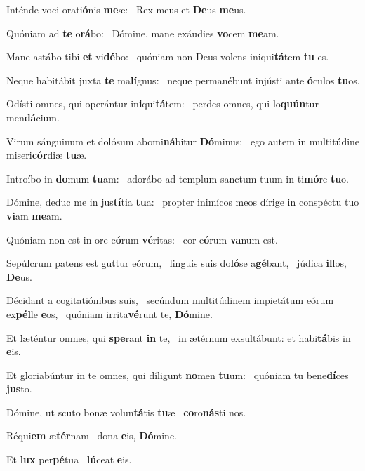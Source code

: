 \item Inténde voci orati\textbf{ó}nis \textbf{me}æ:~\psstar{} Rex meus et \textbf{De}us \textbf{me}us.

\item Quóniam ad \textbf{te} o\textbf{rá}bo:~\psstar{} Dómine, mane exáudies \textbf{vo}cem \textbf{me}am.

\item Mane astábo tibi \textbf{et} vi\textbf{dé}bo:~\psstar{} quóniam non Deus volens iniqui\textbf{tá}tem \textbf{tu} es.

\item Neque habitábit juxta \textbf{te} ma\textbf{lí}gnus:~\psstar{} neque permanébunt injústi ante \textbf{ó}culos \textbf{tu}os.

\item Odísti omnes, qui operántur in\textbf{i}qui\textbf{tá}tem:~\psstar{} perdes omnes, qui lo\textbf{quún}tur men\textbf{dá}cium.

\item Virum sánguinum et dolósum abomi\textbf{ná}bitur \textbf{Dó}minus:~\psstar{} ego autem in multitúdine miseri\textbf{cór}diæ \textbf{tu}æ.

\item Introíbo in \textbf{do}mum \textbf{tu}am:~\psstar{} adorábo ad templum sanctum tuum in ti\textbf{mó}re \textbf{tu}o.

\item Dómine, deduc me in jus\textbf{tí}tia \textbf{tu}a:~\psstar{} propter inimícos meos dírige in conspéctu tuo \textbf{vi}am \textbf{me}am.

\item Quóniam non est in ore e\textbf{ó}rum \textbf{vé}ritas:~\psstar{} cor e\textbf{ó}rum \textbf{va}num est.

\item Sepúlcrum patens est guttur eórum,~\pscross{} linguis suis do\textbf{ló}se a\textbf{gé}bant,~\psstar{} júdica \textbf{il}los, \textbf{De}us.

\item Décidant a cogitatiónibus suis,~\pscross{} secúndum multitúdinem impietátum eórum ex\textbf{pél}le \textbf{e}os,~\psstar{} quóniam irrita\textbf{vé}runt te, \textbf{Dó}mine.

\item Et læténtur omnes, qui \textbf{spe}rant \textbf{in} te,~\psstar{} in ætérnum exsultábunt: et habi\textbf{tá}bis in \textbf{e}is.

\item Et gloriabúntur in te omnes, qui díligunt \textbf{no}men \textbf{tu}um:~\psstar{} quóniam tu bene\textbf{dí}ces \textbf{jus}to.

\item Dómine, ut scuto bonæ volun\textbf{tá}tis \textbf{tu}æ~\psstar{} \textbf{co}ro\textbf{nás}ti nos.
\item Réqui\textbf{em} æ\textbf{tér}nam~\psstar{} dona \textbf{e}is, \textbf{Dó}mine.
\item Et \textbf{lux} per\textbf{pé}tua~\psstar{} \textbf{lú}ceat \textbf{e}is.